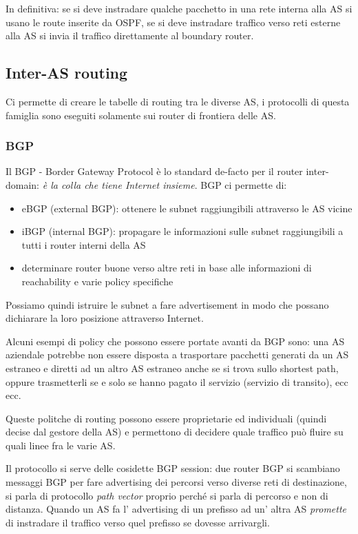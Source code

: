 In definitiva: se si deve instradare qualche pacchetto in una rete interna alla AS si usano le route inserite da OSPF, se si deve instradare traffico verso reti esterne alla AS si invia il traffico direttamente al boundary router.

\subsection{Inter-AS routing}
Ci permette di creare le tabelle di routing tra le diverse AS, i protocolli di questa famiglia sono eseguiti solamente sui router di frontiera delle AS.

\subsubsection{BGP}
Il BGP - Border Gateway Protocol è lo standard de-facto per il router inter-domain: \emph{è la colla che tiene Internet insieme}.
BGP ci permette di:
\begin{itemize}
    \item eBGP (external BGP): ottenere le subnet raggiungibili attraverso le AS vicine
    \item iBGP (internal BGP): propagare le informazioni sulle subnet raggiungibili a tutti i router interni della AS
    \item determinare router buone verso altre reti in base alle informazioni di reachability e varie policy specifiche
\end{itemize}
Possiamo quindi istruire le subnet a fare advertisement in modo che possano dichiarare la loro posizione attraverso Internet.

Alcuni esempi di policy che possono essere portate avanti da BGP sono: una AS aziendale potrebbe non essere disposta a trasportare pacchetti generati da un AS estraneo e diretti ad un altro AS estraneo anche se si trova sullo shortest path, oppure trasmetterli se e solo se hanno pagato il servizio (servizio di transito), ecc ecc.

Queste politche di routing possono essere proprietarie ed individuali (quindi decise dal gestore della AS) e permettono di decidere quale traffico può fluire su quali linee fra le varie AS.

Il protocollo si serve delle cosidette BGP session: due router BGP si scambiano messaggi BGP per fare advertising dei percorsi verso diverse reti di destinazione, si parla di protocollo \emph{path vector} proprio perché si parla di percorso e non di distanza.
Quando un AS fa l' advertising  di un prefisso ad un' altra AS \emph{promette} di instradare il traffico verso quel prefisso se dovesse arrivargli.

